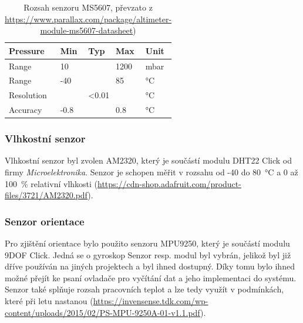 \documentclass[twoside]{ctuthesis}
\theoremstyle{plain}
\theoremstyle{definition}
\theoremstyle{note}
\begin{document}
			\begin{table}[]
				\begin{tabular}{|l|lll|l|}
				\hline
				Pressure   & \multicolumn{1}{l|}{Min}  & \multicolumn{1}{l|}{Typ} & Max  & Unit \\ \hline
				Range      & \multicolumn{1}{l|}{10}   & \multicolumn{1}{l|}{}    & 1200 & mbar \\ \hline
				Range      & \multicolumn{1}{l|}{-40}  & \multicolumn{1}{l|}{}    & 85   & °C   \\ \hline
				Resolution & \multicolumn{3}{c|}{\textless{}0.01}                        & °C   \\ \hline
				Accuracy   & \multicolumn{1}{l|}{-0.8} & \multicolumn{1}{l|}{}    & 0.8  & °C   \\ \hline
				\end{tabular}
				\caption{Rozsah senzoru MS5607, převzato z \url{https://www.parallax.com/package/altimeter-module-ms5607-datasheet})}
				\label{tab:ms:range}
			\end{table}

			


			
			\subsubsection{Vlhkostní senzor}
			Vlhkostní senzor byl zvolen AM2320, který je součástí modulu DHT22 Click od firmy \textit{Microelektronika}. Senzor je schopen měřit v rozsahu od -40 do 80~°C a 0 až 100~\% relativní vlhkosti (\url{https://cdn-shop.adafruit.com/product-files/3721/AM2320.pdf}). 



			
			\subsubsection{Senzor orientace}
			Pro zjištění orientace bylo použito senzoru MPU9250, který je součástí modulu 9DOF Click. Jedná se o gyroskop Senzor resp. modul byl vybrán, jelikož byl již dříve používán na jiných projektech a byl ihned dostupný. Díky tomu bylo ihned možné přejít ke psaní ovladače pro vyčítání dat a jeho implementaci do systému. Senzor také splňuje rozsah pracovních teplot a lze tedy využít v podmínkách, které při letu nastanou (\url{https://invensense.tdk.com/wp-content/uploads/2015/02/PS-MPU-9250A-01-v1.1.pdf}).  
			


		
		
\end{document}
